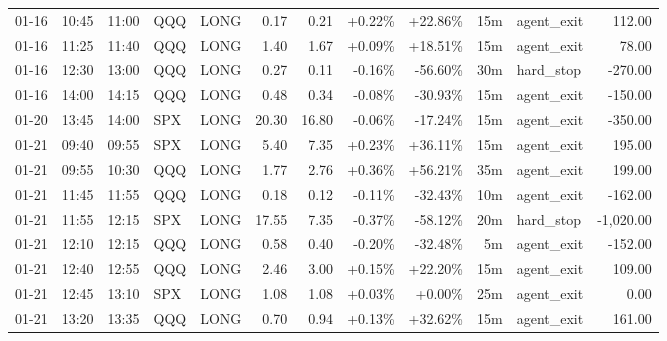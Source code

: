 \documentclass[11pt,a4paper]{article}
\begin{document}
\begin{center}
\begin{longtable}{>{\color{txtmain}}l l l l l r r r r r >{\color{txtmain}}l r}
01-16 & 10:45 & 11:00 & QQQ & LONG & 0.17 & 0.21 & \textcolor{wingreen}{+0.22\%} & \textcolor{wingreen}{+22.86\%} & 15m & agent\_exit & \textcolor{wingreen}{112.00} \\
01-16 & 11:25 & 11:40 & QQQ & LONG & 1.40 & 1.67 & \textcolor{wingreen}{+0.09\%} & \textcolor{wingreen}{+18.51\%} & 15m & agent\_exit & \textcolor{wingreen}{78.00} \\
01-16 & 12:30 & 13:00 & QQQ & LONG & 0.27 & 0.11 & \textcolor{lossred}{-0.16\%} & \textcolor{lossred}{-56.60\%} & 30m & hard\_stop & \textcolor{lossred}{-270.00} \\
01-16 & 14:00 & 14:15 & QQQ & LONG & 0.48 & 0.34 & \textcolor{lossred}{-0.08\%} & \textcolor{lossred}{-30.93\%} & 15m & agent\_exit & \textcolor{lossred}{-150.00} \\
01-20 & 13:45 & 14:00 & SPX & LONG & 20.30 & 16.80 & \textcolor{lossred}{-0.06\%} & \textcolor{lossred}{-17.24\%} & 15m & agent\_exit & \textcolor{lossred}{-350.00} \\
01-21 & 09:40 & 09:55 & SPX & LONG & 5.40 & 7.35 & \textcolor{wingreen}{+0.23\%} & \textcolor{wingreen}{+36.11\%} & 15m & agent\_exit & \textcolor{wingreen}{195.00} \\
01-21 & 09:55 & 10:30 & QQQ & LONG & 1.77 & 2.76 & \textcolor{wingreen}{+0.36\%} & \textcolor{wingreen}{+56.21\%} & 35m & agent\_exit & \textcolor{wingreen}{199.00} \\
01-21 & 11:45 & 11:55 & QQQ & LONG & 0.18 & 0.12 & \textcolor{lossred}{-0.11\%} & \textcolor{lossred}{-32.43\%} & 10m & agent\_exit & \textcolor{lossred}{-162.00} \\
01-21 & 11:55 & 12:15 & SPX & LONG & 17.55 & 7.35 & \textcolor{lossred}{-0.37\%} & \textcolor{lossred}{-58.12\%} & 20m & hard\_stop & \textcolor{lossred}{-1,020.00} \\
01-21 & 12:10 & 12:15 & QQQ & LONG & 0.58 & 0.40 & \textcolor{lossred}{-0.20\%} & \textcolor{lossred}{-32.48\%} & 5m & agent\_exit & \textcolor{lossred}{-152.00} \\
01-21 & 12:40 & 12:55 & QQQ & LONG & 2.46 & 3.00 & \textcolor{wingreen}{+0.15\%} & \textcolor{wingreen}{+22.20\%} & 15m & agent\_exit & \textcolor{wingreen}{109.00} \\
01-21 & 12:45 & 13:10 & SPX & LONG & 1.08 & 1.08 & \textcolor{wingreen}{+0.03\%} & \textcolor{wingreen}{+0.00\%} & 25m & agent\_exit & \textcolor{wingreen}{0.00} \\
01-21 & 13:20 & 13:35 & QQQ & LONG & 0.70 & 0.94 & \textcolor{wingreen}{+0.13\%} & \textcolor{wingreen}{+32.62\%} & 15m & agent\_exit & \textcolor{wingreen}{161.00} \\

\end{longtable}
\end{center}
\end{document}
